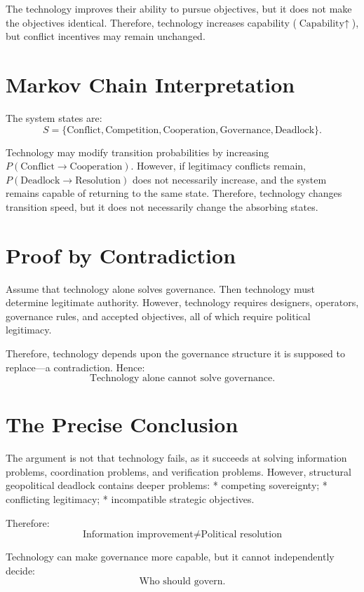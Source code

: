 \documentclass[11pt,openany]{book}
\theoremstyle{plain}
\theoremstyle{definition}
\begin{document}
The technology improves their ability to pursue objectives, but it does not make the objectives identical. Therefore, technology increases capability (\(\text{Capability} \uparrow\)), but conflict incentives may remain unchanged.

\section*{Markov Chain Interpretation}

The system states are:
\[
S = \{\text{Conflict}, \text{Competition}, \text{Cooperation}, \text{Governance}, \text{Deadlock}\}.
\]

Technology may modify transition probabilities by increasing \(P(\text{Conflict} \to \text{Cooperation})\). However, if legitimacy conflicts remain, \(P(\text{Deadlock} \to \text{Resolution})\) does not necessarily increase, and the system remains capable of returning to the same state. Therefore, technology changes transition speed, but it does not necessarily change the absorbing states.

\section*{Proof by Contradiction}

Assume that technology alone solves governance. Then technology must determine legitimate authority. However, technology requires designers, operators, governance rules, and accepted objectives, all of which require political legitimacy. 

Therefore, technology depends upon the governance structure it is supposed to replace—a contradiction. Hence:
\[
\boxed{
\text{Technology alone cannot solve governance.}
}
\]

\section*{The Precise Conclusion}

The argument is not that technology fails, as it succeeds at solving information problems, coordination problems, and verification problems. However, structural geopolitical deadlock contains deeper problems:
* competing sovereignty;
* conflicting legitimacy;
* incompatible strategic objectives.

Therefore:
\[
\boxed{
\text{Information improvement} \neq \text{Political resolution}
}
\]

Technology can make governance more capable, but it cannot independently decide:
\[
\boxed{
\text{Who should govern.}
}
\]
\end{document}
